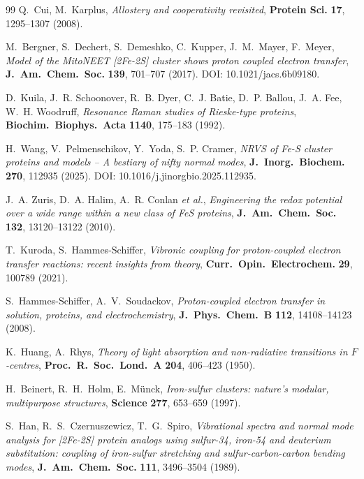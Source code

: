 \documentclass[11pt,a4paper,twoside]{article}
\theoremstyle{remark}
\begin{document}
\begin{thebibliography}{99}
Q.~Cui, M.~Karplus,
\emph{Allostery and cooperativity revisited},
\textbf{Protein Sci.} \textbf{17}, 1295--1307 (2008).

M.~Bergner, S.~Dechert, S.~Demeshko, C.~Kupper, J.~M.~Mayer, F.~Meyer,
\emph{Model of the {MitoNEET} {[}2Fe-2S{]} cluster shows proton coupled
electron transfer},
\textbf{J.\ Am.\ Chem.\ Soc.} \textbf{139}, 701--707 (2017).
DOI: 10.1021/jacs.6b09180.

D.~Kuila, J.~R. Schoonover, R.~B. Dyer, C.~J. Batie, D.~P. Ballou,
J.~A. Fee, W.~H. Woodruff,
\emph{Resonance {R}aman studies of {R}ieske-type proteins},
\textbf{Biochim.\ Biophys.\ Acta} \textbf{1140}, 175--183 (1992).

H.~Wang, V.~Pelmenschikov, Y.~Yoda, S.~P. Cramer,
\emph{NRVS of {Fe-S} cluster proteins and models -- A bestiary of
nifty normal modes},
\textbf{J.\ Inorg.\ Biochem.} \textbf{270}, 112935 (2025).
DOI: 10.1016/j.jinorgbio.2025.112935.

J.~A. Zuris, D.~A. Halim, A.~R. Conlan \emph{et al.},
\emph{Engineering the redox potential over a wide range within a
new class of FeS proteins},
\textbf{J.\ Am.\ Chem.\ Soc.} \textbf{132}, 13120--13122 (2010).

T.~Kuroda, S.~Hammes-Schiffer,
\emph{Vibronic coupling for proton-coupled electron transfer reactions:
recent insights from theory},
\textbf{Curr.\ Opin.\ Electrochem.} \textbf{29}, 100789 (2021).


S.~Hammes-Schiffer, A.~V.~Soudackov,
\emph{Proton-coupled electron transfer in solution, proteins, and
electrochemistry},
\textbf{J.\ Phys.\ Chem.\ B} \textbf{112}, 14108--14123 (2008).

K.~Huang, A.~Rhys,
\emph{Theory of light absorption and non-radiative transitions in
$F$-centres},
\textbf{Proc.\ R.\ Soc.\ Lond.\ A} \textbf{204}, 406--423 (1950).

H.~Beinert, R.~H.~Holm, E.~M\"unck,
\emph{Iron-sulfur clusters: nature's modular, multipurpose structures},
\textbf{Science} \textbf{277}, 653--659 (1997).

S.~Han, R.~S.~Czernuszewicz, T.~G.~Spiro,
\emph{Vibrational spectra and normal mode analysis for {[}2Fe-2S{]}
protein analogs using sulfur-34, iron-54 and deuterium substitution:
coupling of iron-sulfur stretching and sulfur-carbon-carbon bending modes},
\textbf{J.\ Am.\ Chem.\ Soc.} \textbf{111}, 3496--3504 (1989).


\end{thebibliography}
\end{document}
